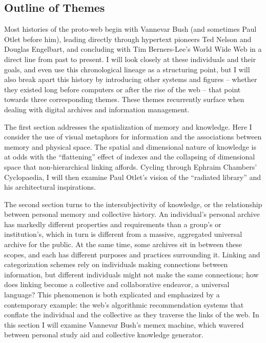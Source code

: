 \subsection{Outline of Themes}

Most histories of the proto-web begin with Vannevar Bush (and sometimes Paul Otlet before him), leading directly through hypertext pioneers Ted Nelson and Douglas Engelbart, and concluding with Tim Berners-Lee’s World Wide Web in a direct line from past to present. I will look closely at these individuals and their goals, and even use this chronological lineage as a structuring point, but I will also break apart this history by introducing other systems and figures – whether they existed long before computers or after the rise of the web – that point towards three corresponding themes. These themes recurrently surface when dealing with digital archives and information management.

The first section addresses the spatialization of memory and knowledge. Here I consider the use of visual metaphors for information and the associations between memory and physical space. The spatial and dimensional nature of knowledge is at odds with the “flattening” effect of indexes and the collapsing of dimensional space that non-hierarchical linking affords. Cycling through Ephraim Chambers’ Cyclopaedia, I will then examine Paul Otlet’s vision of the “radiated library” and his architectural inspirations.

The second section turns to the intersubjectivity of knowledge, or the relationship between personal memory and collective history. An individual’s personal archive has markedly different properties and requirements than a group’s or institution’s, which in turn is different from a massive, aggregated universal archive for the public. At the same time, some archives sit in between these scopes, and each has different purposes and practices surrounding it. Linking and categorization schemes rely on individuals making connections between information, but different individuals might not make the same connections; how does linking become a collective and collaborative endeavor, a universal language? This phenomenon is both explicated and emphasized by a contemporary example: the web’s algorithmic recommendation systems that conflate the individual and the collective as they traverse the links of the web. In this section I will examine Vannevar Bush’s memex machine, which wavered between personal study aid and collective knowledge generator.

